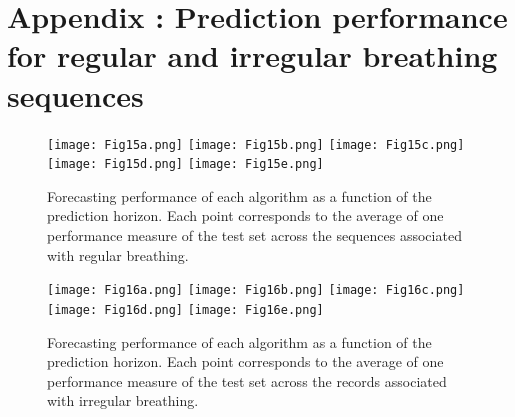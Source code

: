 \documentclass[twocolumn,a4paper]{svjour3} \sloppy          \smartqed
\begin{document}
\clearpage

\section{Appendix : Prediction performance for regular and irregular breathing sequences}\label{appendix:pred perf}

\begin{figure*}[htb!]
    \centering
    \texttt{[image: Fig15a.png]}\qquad
    \texttt{[image: Fig15b.png]}\qquad
    \texttt{[image: Fig15c.png]}\qquad
    \texttt{[image: Fig15d.png]}\qquad
    \texttt{[image: Fig15e.png]}\caption{Forecasting performance of each algorithm as a function of the prediction horizon. Each point corresponds to the average of one performance measure of the test set across the sequences associated with regular breathing. }
    \label{fig:pred perf regular}
\end{figure*}

\clearpage

\begin{figure*}[htb!]
    \centering
    \texttt{[image: Fig16a.png]}\qquad
    \texttt{[image: Fig16b.png]}\qquad
    \texttt{[image: Fig16c.png]}\qquad
    \texttt{[image: Fig16d.png]}\qquad
    \texttt{[image: Fig16e.png]}\caption{Forecasting performance of each algorithm as a function of the prediction horizon. Each point corresponds to the average of one performance measure of the test set across the records associated with irregular breathing. \protect\footnotemark}
    \label{fig:pred perf irregular}
\end{figure*}

\end{document}
